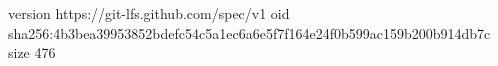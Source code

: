 version https://git-lfs.github.com/spec/v1
oid sha256:4b3bea39953852bdefc54c5a1ec6a6e5f7f164e24f0b599ac159b200b914db7c
size 476
